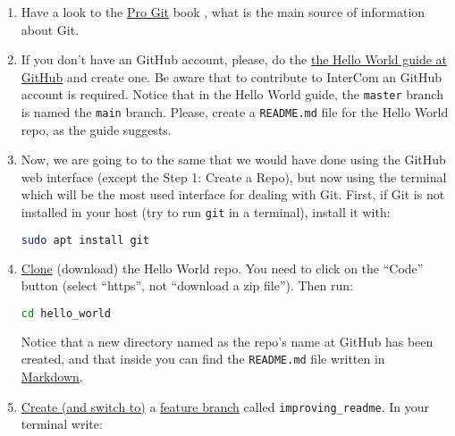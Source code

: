 \begin{enumerate}
  
\item Have a look to the \href{https://git-scm.com/book/en/v2}{Pro Git} 
  book \cite{Git-book}, what is the main source of information about
  Git.

\item If you don't have an GitHub account, please, do the
  \href{https://guides.github.com/activities/hello-world/}{the Hello
    World guide at GitHub} and create one. Be aware that to contribute
  to InterCom an GitHub account is required. Notice that in the Hello
  World guide, the \texttt{master} branch is named the \texttt{main}
  branch. Please, create a \texttt{README.md} file for the Hello World
  repo, as the guide suggests.

\item Now, we are going to to the same that we would have done using
  the GitHub web interface (except the Step 1: Create a Repo), but now
  using the terminal which will be the most used interface for dealing
  with Git. First, if Git is not installed in your host (try to run
  \texttt{git} in a terminal), install it with:

  \begin{lstlisting}[language=bash]
    sudo apt install git
  \end{lstlisting}

\item
  \href{https://docs.github.com/en/github/getting-started-with-github/github-glossary#clone}{Clone}
  (download) the Hello World repo. You need to click on the ``Code''
  button (select ``https'', not ``download a
  zip file''). Then run:

  \begin{lstlisting}[language=bash]
    cd hello_world
  \end{lstlisting}

  Notice that a new directory named as the repo's name at GitHub has
  been created, and that inside you can find the \texttt{README.md}
  file written in
  \href{https://daringfireball.net/projects/markdown/}{Markdown}.

\item \href{https://docs.github.com/en/github/getting-started-with-github/github-glossary#checkout}{Create (and switch to)} a
  \href{https://docs.github.com/en/github/getting-started-with-github/github-glossary#feature-branch}{feature
    branch} called \texttt{improving\_readme}. In your terminal write:
  

\end{enumerate}
